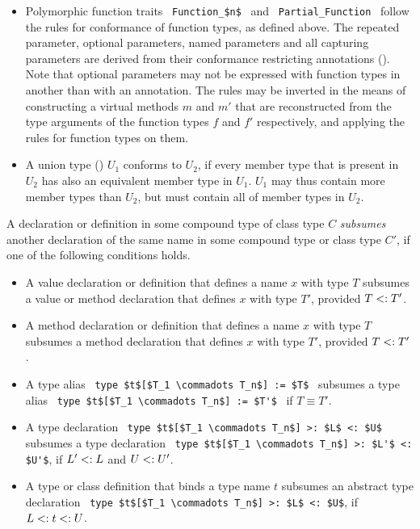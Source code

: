 \begin{itemize}
\item
Polymorphic function traits ~\lstinline!Function_$n$!~ and ~\lstinline!Partial_Function!~ follow the rules for conformance of function types, as defined above. The repeated parameter, optional parameters, named parameters and all capturing parameters are derived from their conformance restricting annotations (). Note that optional parameters may not be expressed with function types in another than with an annotation. The rules may be inverted in the means of constructing a virtual methods $m$ and $m'$ that are reconstructed from the type arguments of the function types $f$ and $f'$ respectively, and applying the rules for function types on them.
 
\item 
A union type () $U_1$ conforms to $U_2$, if every member type that is present in $U_2$ has also an equivalent member type in $U_1$. $U_1$ may thus contain more member types than $U_2$, but must contain all of member types in $U_2$. 
\end{itemize}

A declaration or definition in some compound type of class type $C$ {\em subsumes} another declaration of the same name in some compound type or class type $C'$, if one of the following conditions holds. 
  \begin{itemize}
  \item A value declaration or definition that defines a name $x$ with type $T$ subsumes a value or method declaration that defines $x$ with type $T'$, provided $T <: T'$. 
  \item A method declaration or definition that defines a name $x$ with type $T$ subsumes a method declaration that defines $x$ with type $T'$, provided $T <: T'$. 
  \item A type alias ~\lstinline!type $t$[$T_1 \commadots T_n$] := $T$!~ subsumes a type alias ~\lstinline!type $t$[$T_1 \commadots T_n$] := $T'$!~ if $T \equiv T'$. 
  \item A type declaration ~\lstinline!type $t$[$T_1 \commadots T_n$] >: $L$ <: $U$!~ subsumes a type declaration ~\lstinline!type $t$[$T_1 \commadots T_n$] >: $L'$ <: $U'$!, if $L' <: L$ and $U <: U'$. 
  \item A type or class definition that binds a type name $t$ subsumes an abstract type declaration ~\lstinline!type $t$[$T_1 \commadots T_n$] >: $L$ <: $U$!, if $L <: t <: U$. 
  \end{itemize}

